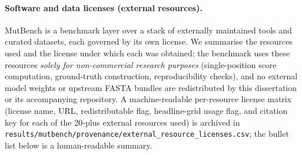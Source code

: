 \paragraph{Software and data licenses (external resources).}
\label{para:external_licenses}
MutBench is a benchmark layer over a stack of externally maintained tools and curated datasets, each governed by its own license. We summarise the resources used and the license under which each was obtained; the benchmark uses these resources \emph{solely for non-commercial research purposes} (single-position score computation, ground-truth construction, reproducibility checks), and no external model weights or upstream FASTA bundles are redistributed by this dissertation or its accompanying repository. A machine-readable per-resource license matrix (license name, URL, redistributable flag, headline-grid usage flag, and citation key for each of the 20-plus external resources used) is archived in \texttt{results/mutbench/provenance/external\_resource\_licenses.csv}; the bullet list below is a human-readable summary.
